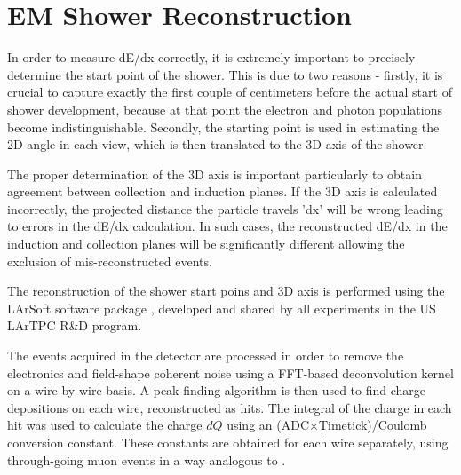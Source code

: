 
\section{EM Shower Reconstruction}
\label{sec:Reco}


In order to measure dE/dx correctly, it is extremely important to precisely determine the start point of the shower. 
This is due to two reasons - firstly, it is crucial to capture exactly the first couple of centimeters before the actual 
start of shower development, because at that point the electron and photon populations 
become indistinguishable. Secondly, the starting point is used in estimating the 
2D angle in each view, which is then translated to the 3D axis of the shower.

The proper determination of the 3D axis is important particularly to obtain 
agreement between collection and induction 
planes.  If the 3D axis is calculated incorrectly, the projected distance the particle travels 'dx' will be wrong
leading to errors in the dE/dx calculation. In such cases, the reconstructed dE/dx in the induction and collection planes will be significantly different
allowing the exclusion of mis-reconstructed events. 


The reconstruction of the shower start poins and 3D axis is performed using the LArSoft software package \cite{LArSoft}, developed and shared by all experiments in the US 
LArTPC R\&D program. 

The events acquired in the detector are processed in order to remove the 
electronics and field-shape coherent noise using a FFT-based deconvolution 
kernel on a wire-by-wire basis. A peak finding algorithm is then used to find 
charge depositions on each wire, reconstructed as hits. The integral of 
the charge in each hit was used to calculate the charge $dQ$ using an  
(ADC$\times$Timetick)/Coulomb conversion constant. These constants are obtained 
for each wire separately, using through-going muon events in a way analogous to 
\cite{TGMuon}.

